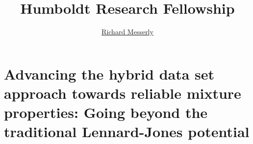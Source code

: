 \documentclass[12pt,a4paper]{article}
\begin{document}
	\thispagestyle{empty}
	\title{\Large \textbf{Humboldt Research Fellowship}}
	\author[1]{\large {\underline{Richard Messerly}}}%
	
	
	\date{} %
	\justify

%
%
%
%
%

\section*{Advancing the hybrid data set approach towards reliable mixture properties: Going beyond the traditional Lennard-Jones potential}

\end{document}
